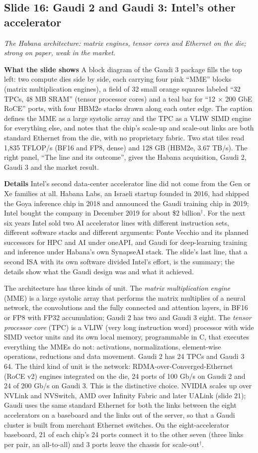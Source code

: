\documentclass[11pt,letterpaper]{article}
\newcommand{\slide}[3]{%
  \subsection[Slide #1: #2]{Slide #1: #2}%
  {\color{muted}\itshape #3\par}\medskip}
\newcommand{\para}[1]{\medskip\noindent\textbf{#1}\quad}
\begin{document}
\slide{16}{Gaudi 2 and Gaudi 3: Intel's other accelerator}{The Habana architecture: matrix engines, tensor cores and Ethernet on the die; strong on paper, weak in the market.}

\para{What the slide shows} A block diagram of the Gaudi 3 package fills the top left: two compute dies side by side, each carrying four pink ``MME'' blocks (matrix multiplication engines), a field of 32 small orange squares labeled ``32 TPCs, 48 MB SRAM'' (tensor processor cores) and a teal bar for ``12 $\times$ 200 GbE RoCE'' ports, with four HBM2e stacks drawn along each outer edge. The caption defines the MME as a large systolic array and the TPC as a VLIW SIMD engine for everything else, and notes that the chip's scale-up and scale-out links are both standard Ethernet from the die, with no proprietary fabric. Two stat tiles read 1{,}835 TFLOP/s (BF16 and FP8, dense) and 128 GB (HBM2e, 3.67 TB/s). The right panel, ``The line and its outcome'', gives the Habana acquisition, Gaudi 2, Gaudi 3 and the market result.

\para{Details} Intel's second data-center accelerator line did not come from the Gen or Xe families at all. Habana Labs, an Israeli startup founded in 2016, had shipped the Goya inference chip in 2018 and announced the Gaudi training chip in 2019; Intel bought the company in December 2019 for about \$2 billion$^\dagger$. For the next six years Intel sold two AI accelerator lines with different instruction sets, different software stacks and different arguments: Ponte Vecchio and its planned successors for HPC and AI under oneAPI, and Gaudi for deep-learning training and inference under Habana's own SynapseAI stack. The slide's last line, that a second ISA with its own software divided Intel's effort, is the summary; the details show what the Gaudi design was and what it achieved.

The architecture has three kinds of unit. The \emph{matrix multiplication engine} (MME) is a large systolic array that performs the matrix multiplies of a neural network, the convolutions and the fully connected and attention layers, in BF16 or FP8 with FP32 accumulation; Gaudi 2 has two and Gaudi 3 eight. The \emph{tensor processor core} (TPC) is a VLIW (very long instruction word) processor with wide SIMD vector units and its own local memory, programmable in C, that executes everything the MMEs do not: activations, normalizations, element-wise operations, reductions and data movement. Gaudi 2 has 24 TPCs and Gaudi 3 64. The third kind of unit is the network: RDMA-over-Converged-Ethernet (RoCE v2) engines integrated on the die, 24 ports of 100 Gb/s on Gaudi 2 and 24 of 200 Gb/s on Gaudi 3. This is the distinctive choice. NVIDIA scales up over NVLink and NVSwitch, AMD over Infinity Fabric and later UALink (slide 21); Gaudi uses the same standard Ethernet for both the links between the eight accelerators on a baseboard and the links out of the server, so that a Gaudi cluster is built from merchant Ethernet switches. On the eight-accelerator baseboard, 21 of each chip's 24 ports connect it to the other seven (three links per pair, an all-to-all) and 3 ports leave the chassis for scale-out$^\dagger$.
\end{document}
